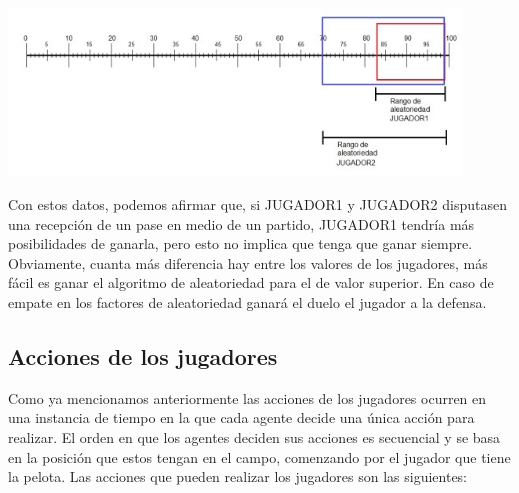 \documentclass{article}
\begin{document}
\includegraphics*[width=0.9\textwidth]{rank.jpg}
\bigskip

Con estos datos, podemos afirmar que, si JUGADOR1 y JUGADOR2 disputasen una recepción de un pase en medio de un 
partido, JUGADOR1 tendría más posibilidades de ganarla, pero esto no implica que tenga que ganar siempre.
Obviamente, cuanta más diferencia hay entre los valores de los jugadores, más fácil es ganar el algoritmo de 
aleatoriedad para el de valor superior. En caso de empate en los factores de aleatoriedad ganará el duelo el 
jugador a la defensa.

\subsection{Acciones de los jugadores}

Como ya mencionamos anteriormente las acciones de los jugadores ocurren en una instancia de tiempo en la que cada agente decide 
una única acción para realizar. El orden en que los agentes deciden sus acciones es secuencial y se basa en la posición que estos tengan en el campo,
comenzando por el jugador que tiene la pelota. Las acciones que pueden realizar los jugadores son las siguientes:
\end{document}
